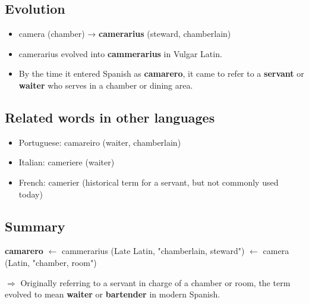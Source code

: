 \documentclass[10pt]{book}
\begin{document}
	\subsection*{Evolution}
	\begin{itemize}
		\item camera (chamber) → \textbf{camerarius} (steward, chamberlain)
		\item camerarius evolved into \textbf{cammerarius} in Vulgar Latin.
		\item By the time it entered Spanish as \textbf{camarero}, it came to refer to a \textbf{servant} or \textbf{waiter} who serves in a chamber or dining area.
	\end{itemize}
	
	\subsection*{Related words in other languages}
	\begin{itemize}
		\item Portuguese: camareiro (waiter, chamberlain)
		\item Italian: cameriere (waiter)
		\item French: camerier (historical term for a servant, but not commonly used today)
	\end{itemize}
	
	\subsection*{Summary}
	\textbf{camarero} $\leftarrow$ cammerarius (Late Latin, "chamberlain, steward") $\leftarrow$ camera (Latin, "chamber, room")
	
	$\Rightarrow$ Originally referring to a servant in charge of a chamber or room, the term evolved to mean \textbf{waiter} or \textbf{bartender} in modern Spanish.
	
\end{document}
